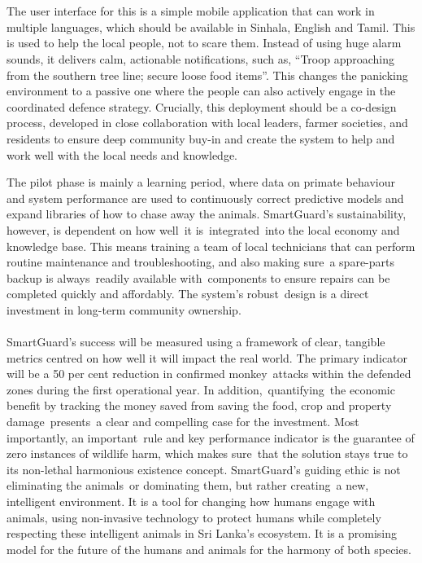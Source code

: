 \documentclass{article}
\begin{document}
\\ \\
The user interface for this is a simple mobile application that can work in multiple languages, which should be available in Sinhala, English and Tamil. This is used to help the local people, not to scare them. Instead of using huge alarm sounds, it delivers calm, actionable notifications, such as, \enquote{Troop approaching from the southern tree line; secure loose food items}. This changes the panicking environment to a passive one where the people can also actively engage in the coordinated defence strategy. Crucially, this deployment should be a co-design process, developed in close collaboration with local leaders, farmer societies, and residents to ensure deep community buy-in and create the system to help and work well with the local needs and knowledge.
 
The pilot phase is mainly a learning period, where data on primate behaviour and system performance are used to continuously correct predictive models and expand libraries of how to chase away the animals.  SmartGuard's sustainability, however, is dependent on how well it is integrated into the local economy and knowledge base.  This means training a team of local technicians that can perform routine maintenance and troubleshooting, and also making sure a spare-parts backup is always readily available with components to ensure repairs can be completed quickly and affordably. The system's robust design is a direct investment in long-term community ownership.
\\ \\
SmartGuard's success will be measured using a framework of clear, tangible metrics centred on how well it will impact the real world.  The primary indicator will be a 50 per cent reduction in confirmed monkey attacks within the defended zones during the first operational year.  In addition, quantifying the economic benefit by tracking the money saved from saving the food, crop and property damage presents a clear and compelling case for the investment.  Most importantly, an important rule and key performance indicator is the guarantee of zero instances of wildlife harm, which makes sure that the solution stays true to its non-lethal harmonious existence concept. SmartGuard's guiding ethic is not eliminating the animals or dominating them, but rather creating a new, intelligent environment.  It is a tool for changing how humans engage with animals, using non-invasive technology to protect humans while completely respecting these intelligent animals in Sri Lanka's ecosystem. It is a promising model for the future of the humans and animals for the harmony of both species.
\end{document}
